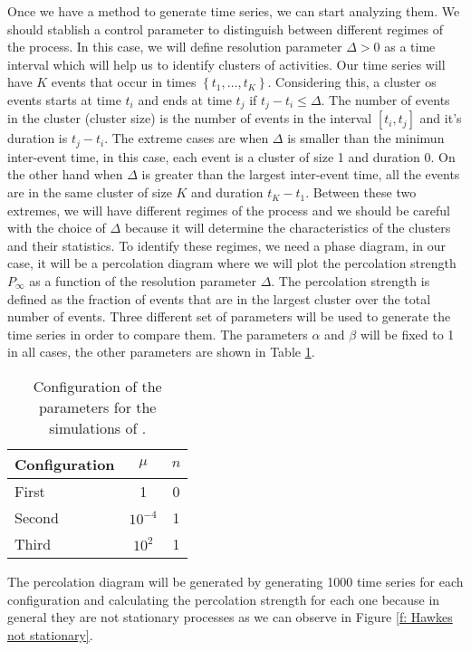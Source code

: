 Once we have a method to generate time series, we can start analyzing them. We should stablish a control parameter to distinguish between different regimes of the process. In this case,
we will define resolution parameter $\Delta >0$ as a time interval which will help us to identify clusters of activities. Our time series will have $K$ events that occur in times 
$\left\{ t_1,\ldots, t_K \right\}$. Considering this, a cluster os events starts at time $t_i$ and ends at time $t_j$ if $t_j-t_i\leq \Delta$. The number of events in the cluster (cluster 
size) is the number of events in the interval $[t_i,t_j]$ and it's duration is $t_j-t_i$. The extreme cases are when $\Delta$ is smaller than the minimun inter-event time, in this case,
each event is a cluster of size 1 and duration 0. On the other hand when $\Delta$ is greater than the largest inter-event time, all the events are in the same cluster of size $K$ and
duration $t_K-t_1$. Between these two extremes, we will have different regimes of the process and we should be careful with the choice of $\Delta$ because it will determine the
characteristics of the clusters and their statistics. To identify these regimes, we need a phase diagram, in our case, it will be a percolation 
diagram where we will plot the percolation strength $P_{\infty}$ as a function of the resolution parameter $\Delta$. The percolation strength is defined as the fraction of events that are
in the largest cluster over the total number of events. Three different set of parameters will be used to generate the time series in order to compare them. The parameters $\alpha$ and 
$\beta$ will be fixed to 1 in all cases, the other parameters are shown in Table \ref{tab: parameters}.

\begin{table}[H]
    \centering
    \caption{Configuration of the parameters for the simulations of \cite{notarmuzi2021percolation}.}
    \label{tab: parameters}
    \begin{tabular}{@{}lcc@{}}
    \toprule
    Configuration & \multicolumn{1}{c}{$\mu$} & \multicolumn{1}{c}{$n$} \\ \midrule
    First & 1 & 0 \\
    Second & $10^{-4}$ & 1 \\
    Third & $10^2$ & 1 \\ \bottomrule
    \end{tabular}
\end{table}

The percolation diagram will be generated by generating 1000 time series for each configuration and calculating the percolation strength for each one because in general they are not stationary
processes as we can observe in Figure \ref{f: Hawkes not stationary}.

